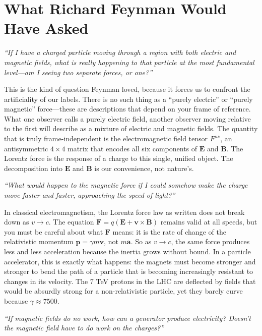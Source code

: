 \documentclass[11pt,openright]{book}
\begin{document}
\section*{What Richard Feynman Would Have Asked}

\textit{``If I have a charged particle moving through a region with both electric and magnetic fields, what is really happening to that particle at the most fundamental level---am I seeing two separate forces, or one?''}

This is the kind of question Feynman loved, because it forces us to confront the artificiality of our labels. There is no such thing as a ``purely electric'' or ``purely magnetic'' force---these are descriptions that depend on your frame of reference. What one observer calls a purely electric field, another observer moving relative to the first will describe as a mixture of electric and magnetic fields. The quantity that is truly frame-independent is the electromagnetic field tensor $F^{\mu\nu}$, an antisymmetric $4\times 4$ matrix that encodes all six components of $\mathbf{E}$ and $\mathbf{B}$. The Lorentz force is the response of a charge to this single, unified object. The decomposition into $\mathbf{E}$ and $\mathbf{B}$ is our convenience, not nature's.

\textit{``What would happen to the magnetic force if I could somehow make the charge move faster and faster, approaching the speed of light?''}

In classical electromagnetism, the Lorentz force law as written does not break down as $v\to c$. The equation $\mathbf{F} = q(\mathbf{E} + \mathbf{v}\times\mathbf{B})$ remains valid at all speeds, but you must be careful about what $\mathbf{F}$ means: it is the rate of change of the relativistic momentum $\mathbf{p} = \gamma m\mathbf{v}$, not $m\mathbf{a}$. So as $v\to c$, the same force produces less and less acceleration because the inertia grows without bound. In a particle accelerator, this is exactly what happens: the magnets must become stronger and stronger to bend the path of a particle that is becoming increasingly resistant to changes in its velocity. The 7 TeV protons in the LHC are deflected by fields that would be absurdly strong for a non-relativistic particle, yet they barely curve because $\gamma \approx 7500$.

\textit{``If magnetic fields do no work, how can a generator produce electricity? Doesn't the magnetic field have to do work on the charges?''}
\end{document}
